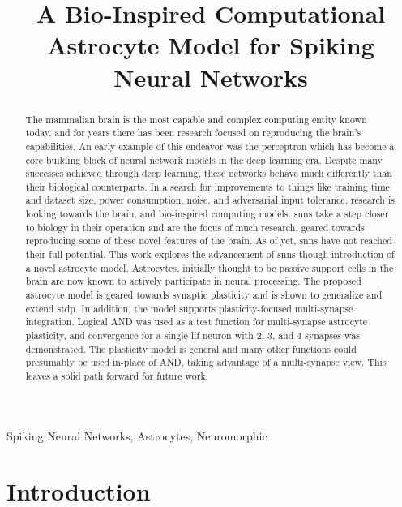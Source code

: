 \documentclass[conference]{IEEEtran}
\title{A Bio-Inspired Computational Astrocyte Model for Spiking Neural Networks}
\author{\IEEEauthorblockN{Anonymous Authors}}
\begin{document}
\maketitle

\begin{abstract}
The mammalian brain is the most capable and complex computing entity known
today, and for years there has been research focused on reproducing the brain's
capabilities. An early example of this endeavor was the perceptron which has
become a core building block of neural network models in the deep learning
era. Despite many successes achieved through deep learning, these networks
behave much differently than their biological counterparts. In a search for
improvements to things like training time and dataset size, power consumption,
noise, and adversarial input tolerance, research is looking towards the brain,
and bio-inspired computing models. \Glspl{snn} take a step closer to biology in
their operation and are the focus of much research, geared towards reproducing
some of these novel features of the brain. As of yet, \glspl{snn} have not
reached their full potential. This work explores the advancement of \glspl{snn}
though introduction of a novel astrocyte model. Astrocytes, initially thought to
be passive support cells in the brain are now known to actively participate in
neural processing. The proposed astrocyte model is geared towards synaptic
plasticity and is shown to generalize and extend \gls{stdp}. In addition, the
model supports plasticity-focused multi-synapse integration. Logical AND was
used as a test function for multi-synapse astrocyte plasticity, and convergence
for a single \gls{lif} neuron with 2, 3, and 4 synapses was demonstrated. The
plasticity model is general and many other functions could presumably be used
in-place of AND, taking advantage of a multi-synapse view. This leaves a solid
path forward for future work.

\end{abstract}

\begin{IEEEkeywords}
Spiking Neural Networks, Astrocytes, Neuromorphic
\end{IEEEkeywords}

\section{Introduction}

\end{document}
